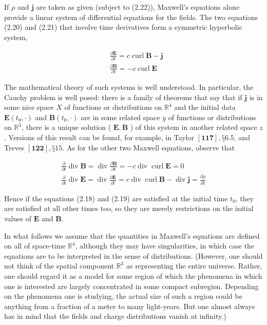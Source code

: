 \documentclass[10pt, letterpaper]{article}
\begin{document}
If $\rho$ and $\mathbf{j}$ are taken as given (subject to (2.22)), Maxwell's equations alone provide a linear system of differential equations for the fields. The two equations (2.20) and (2.21) that involve time derivatives form a symmetric hyperbolic system,

$$
\begin{aligned}
& \frac{\partial \mathbf{E}}{\partial t}=c \operatorname{curl} \mathbf{B}-\mathbf{j} \\
& \frac{\partial \mathbf{B}}{\partial t}=-c \operatorname{curl} \mathbf{E}
\end{aligned}
$$

The mathematical theory of such systems is well understood. In particular, the Cauchy problem is well posed: there is a family of theorems that say that if $\mathbf{j}$ is in some nice space $X$ of functions or distributions on $\mathbb{R}^{4}$ and the initial data $\mathbf{E}\left(t_{0}, \cdot\right)$ and $\mathbf{B}\left(t_{0}, \cdot\right)$ are in some related space $y$ of functions or distributions on $\mathbb{R}^{3}$, there is a unique solution ( $\mathbf{E}, \mathbf{B}$ ) of this system in another related space $z$. Versions of this result can be found, for example, in Taylor $[\mathbf{1 1 7}], § 6.5$, and Treves $[\mathbf{1 2 2}], § 15$. As for the other two Maxwell equations, observe that

$$
\begin{gathered}
\frac{\partial}{\partial t} \operatorname{div} \mathbf{B}=\operatorname{div} \frac{\partial \mathbf{B}}{\partial t}=-c \operatorname{div} \operatorname{curl} \mathbf{E}=0 \\
\frac{\partial}{\partial t} \operatorname{div} \mathbf{E}=\operatorname{div} \frac{\partial \mathbf{E}}{\partial t}=c \operatorname{div} \operatorname{curl} \mathbf{B}-\operatorname{div} \mathbf{j}=\frac{\partial \rho}{\partial t}
\end{gathered}
$$

Hence if the equations (2.18) and (2.19) are satisfied at the initial time $t_{0}$, they are satisfied at all other times too, so they are merely restrictions on the initial values of $\mathbf{E}$ and $\mathbf{B}$.

In what follows we assume that the quantities in Maxwell's equations are defined on all of space-time $\mathbb{R}^{4}$, although they may have singularities, in which case the equations are to be interpreted in the sense of distributions. (However, one should not think of the spatial component $\mathbb{R}^{3}$ as representing the entire universe. Rather, one should regard it as a model for some region of which the phenomena in which one is interested are largely concentrated in some compact subregion. Depending on the phenomena one is studying, the actual size of such a region could be anything from a fraction of a meter to many light-years. But one almost always has in mind that the fields and charge distributions vanish at infinity.)
\end{document}
